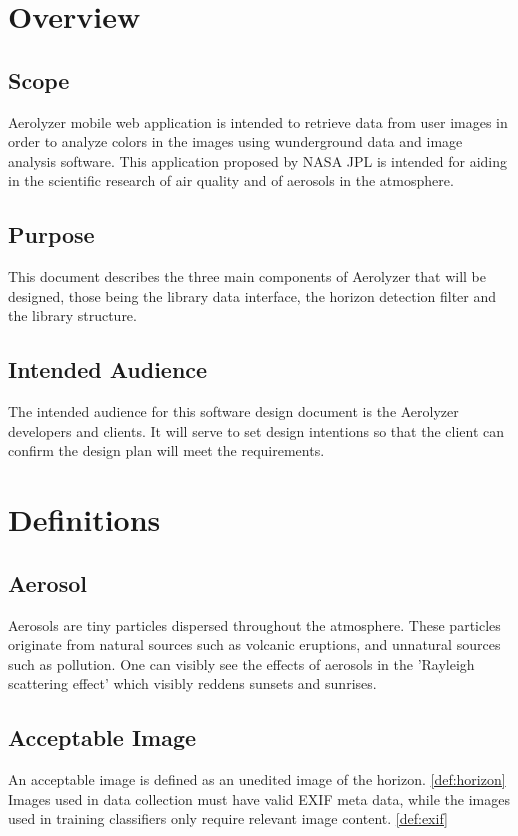 \documentclass[onecolumn, draftclsnofoot,10pt, compsoc]{IEEEtran}
\begin{document}
\begin{singlespace}
\section{Overview}
	\subsection{Scope}
		Aerolyzer mobile web application is intended to retrieve data from user images in order to analyze colors in the images using wunderground data and image analysis software. This application proposed by NASA JPL is intended for aiding in the scientific research of air quality and of aerosols in the atmosphere. 
	\subsection{Purpose}
		This document describes the three main components of Aerolyzer that will be designed, those being the library data interface, the horizon detection filter and the library structure. 
	\subsection{Intended Audience}
		The intended audience for this software design document is the Aerolyzer developers and clients. It will serve to set design intentions so that the client can confirm the design plan will meet the requirements.

\section{Definitions}
	
	\subsection{Aerosol}\label{def:aerosol}
		Aerosols are tiny particles dispersed throughout the atmosphere.
		These particles originate from natural sources such as volcanic eruptions, and unnatural sources such as pollution. 
		One can visibly see the effects of aerosols in the 'Rayleigh scattering effect'  which visibly reddens sunsets and sunrises. \cite{allen_2015}
	
	\subsection{Acceptable Image}\label{def:accImg}
		An acceptable image is defined as an unedited image of the horizon. \ref{def:horizon}
		Images used in data collection must have valid EXIF meta data, while the images used in training classifiers only require relevant image content. \ref{def:exif}
	

\end{singlespace}
\end{document}
